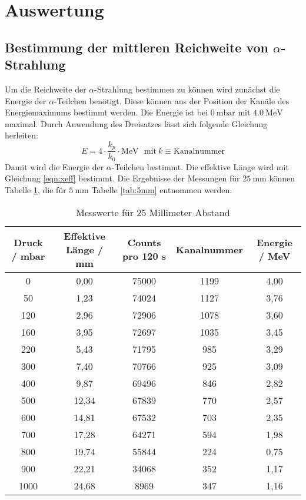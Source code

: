 \section{Auswertung}
\label{sec:Auswertung}
\subsection{Bestimmung der  mittleren Reichweite von \texorpdfstring{$\alpha$}{alpha}-Strahlung}

Um die Reichweite der $\alpha$-Strahlung bestimmen zu können wird zunächst die Energie der $\alpha$-Teilchen benötigt.
Diese können aus der Position der Kanäle des Energiemaximums bestimmt werden.
Die Energie ist bei $\SI{0}{\milli\bar}$ mit $\SI{4.0}{\mega\electronvolt}$ maximal. Durch Anwendung des Dreisatzes lässt sich folgende Gleichung herleiten:
\begin{equation*}
  E = 4 \cdot \frac{k_p}{k_0} \cdot \si{\mega\electronvolt} \: \: \: \text{mit} \: k \equiv \text{Kanalnummer}
\end{equation*}
Damit wird die Energie der $\alpha$-Teilchen bestimmt.
Die effektive Länge wird mit Gleichung \ref{eqn:xeff} bestimmt.
Die Ergebnisse der Messungen für $\SI{25}{\milli\metre}$ können Tabelle \ref{tab:25mm}, die für $\SI{5}{\milli\metre}$ Tabelle \ref{tab:5mm} entnommen werden.
\FloatBarrier
\begin{table}
  \centering
  \caption{Messwerte für 25 Millimeter Abstand}
  \label{tab:25mm}
  \begin{tabular}{c c c c c}
    \toprule
     Druck / \si{\milli\bar} & Effektive Länge / \si{\milli\metre} & Counts pro 120 \si{\second} & Kanalnummer & Energie / \si{\mega\electronvolt}\\
    \midrule
    0   &  0,00 & 75000 & 1199 & 4,00 \\
    50  &  1,23 & 74024 & 1127 & 3,76 \\
    120 &  2,96 & 72906 & 1078 & 3,60 \\
    160 &  3,95 & 72697 & 1035 & 3,45 \\
    220 &  5,43 & 71795 &  985 & 3,29 \\
    300 &  7,40 & 70766 &  925 & 3,09 \\
    400 &  9,87 & 69496 &  846 & 2,82 \\
    500 & 12,34 & 67839 &  770 & 2,57 \\
    600 & 14,81 & 67532 &  703 & 2,35 \\
    700 & 17,28 & 64271 &  594 & 1,98 \\
    800 & 19,74 & 55844 &  224 & 0,75 \\
    900 & 22,21 & 34068 &  352 & 1,17 \\
    1000& 24,68 & 8969  &  347 & 1,16 \\
    \bottomrule
  \end{tabular}
\end{table}
